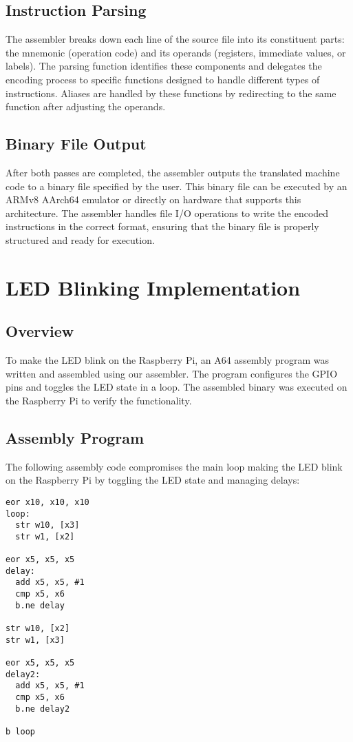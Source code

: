 \documentclass[a4paper, 10pt]{article}
\begin{document}
\subsection{Instruction Parsing}
The assembler breaks down each line of the source file into its constituent parts: the mnemonic (operation code) and its operands (registers, immediate values, or labels). The parsing function identifies these components and delegates the encoding process to specific functions designed to handle different types of instructions. Aliases are handled by these functions by redirecting to the same function after adjusting the operands.

\subsection{Binary File Output}

After both passes are completed, the assembler outputs the translated machine code to a binary file specified by the user. This binary file can be executed by an ARMv8 AArch64 emulator or directly on hardware that supports this architecture. The assembler handles file I/O operations to write the encoded instructions in the correct format, ensuring that the binary file is properly structured and ready for execution.
\newline
\section{LED Blinking Implementation}
\subsection{Overview}
To make the LED blink on the Raspberry Pi, an A64 assembly program was written and assembled using our assembler. The program configures the GPIO pins and toggles the LED state in a loop. The assembled binary was executed on the Raspberry Pi to verify the functionality.

\subsection{Assembly Program}
The following assembly code compromises the main loop making the LED blink on the Raspberry Pi by toggling the LED state and managing delays:

\begin{verbatim}
eor x10, x10, x10
loop:
  str w10, [x3]
  str w1, [x2]

eor x5, x5, x5
delay:
  add x5, x5, #1
  cmp x5, x6
  b.ne delay

str w10, [x2]
str w1, [x3]

eor x5, x5, x5
delay2:
  add x5, x5, #1
  cmp x5, x6
  b.ne delay2

b loop
\end{verbatim}
\end{document}
